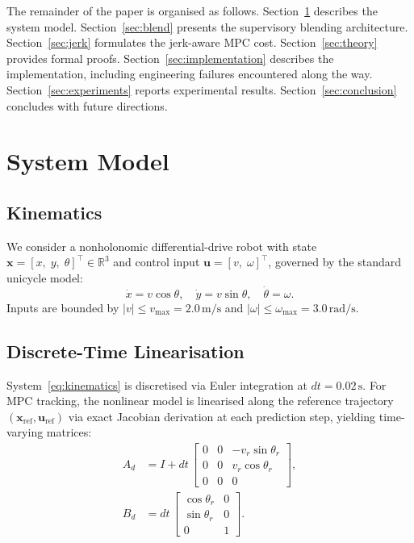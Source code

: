 \documentclass[journal]{IEEEtran}
\newcommand{\R}{\mathbb{R}}
\begin{document}
The remainder of the paper is organised as follows.
Section~\ref{sec:model} describes the system model.
Section~\ref{sec:blend} presents the supervisory blending architecture.
Section~\ref{sec:jerk} formulates the jerk-aware MPC cost.
Section~\ref{sec:theory} provides formal proofs.
Section~\ref{sec:implementation} describes the implementation, including
engineering failures encountered along the way.
Section~\ref{sec:experiments} reports experimental results.
Section~\ref{sec:conclusion} concludes with future directions.

\section{System Model}\label{sec:model}

\subsection{Kinematics}

We consider a nonholonomic differential-drive robot with state
\(\mathbf{x} = [x,\; y,\; \theta]^\top \in \R^3\) and control input
\(\mathbf{u} = [v,\; \omega]^\top\), governed by the standard unicycle model:
\begin{equation}\label{eq:kinematics}
  \dot{x}    = v\cos\theta, \quad
  \dot{y}    = v\sin\theta, \quad
  \dot{\theta} = \omega.
\end{equation}
Inputs are bounded by \(|v| \leq v_{\max} = 2.0\,\text{m/s}\) and
\(|\omega| \leq \omega_{\max} = 3.0\,\text{rad/s}\).

\subsection{Discrete-Time Linearisation}

System~\eqref{eq:kinematics} is discretised via Euler integration at
\(dt = 0.02\,\text{s}\). For MPC tracking, the nonlinear model is linearised
along the reference trajectory \((\mathbf{x}_{\mathrm{ref}},
\mathbf{u}_{\mathrm{ref}})\) via exact Jacobian derivation at each prediction
step, yielding time-varying matrices:
\begin{align}
  A_d &= I + dt\,
  \begin{bmatrix}
    0 & 0 & -v_r\sin\theta_r \\
    0 & 0 &  v_r\cos\theta_r \\
    0 & 0 & 0
  \end{bmatrix},\label{eq:Ad}\\[4pt]
  B_d &= dt\,
  \begin{bmatrix}
    \cos\theta_r & 0 \\
    \sin\theta_r & 0 \\
    0            & 1
  \end{bmatrix}.\label{eq:Bd}
\end{align}
\end{document}
